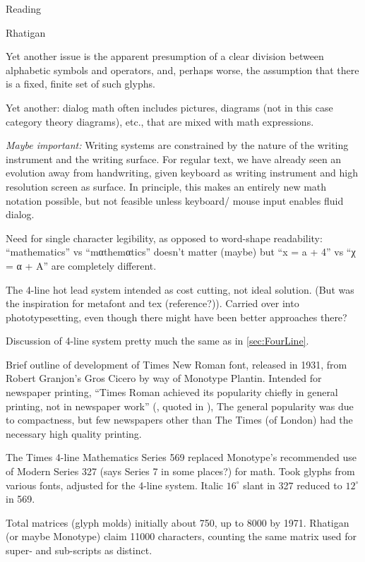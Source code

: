 \documentclass[11pt]{PalisadesLakesBook}
\begin{document}
\begin{plSection}{Reading}
\begin{plSection}{Rhatigan}
\begin{plSection}{}
Yet another issue is the apparent presumption of a clear division
between alphabetic symbols and operators, and, perhaps worse,
the assumption that there is a fixed, finite set of such glyphs.

Yet another: dialog math often includes pictures, diagrams 
(not in this case category theory diagrams), etc.,
that are mixed with math expressions.

\emph{Maybe important:} 
Writing systems are constrained by the nature of the writing
instrument and the writing surface.
For regular text, we have already seen an evolution away from
handwriting, given keyboard as writing instrument
and high resolution screen as surface.
In principle, this makes an entirely new math notation possible,
but not feasible unless keyboard/ mouse input enables
fluid dialog. 

Need for single character legibility, as opposed to word-shape
readability:
``mathematics'' vs ``mαthemαtics'' doesn't matter (maybe)
but ``x = a + 4'' vs ``χ = α + A'' are completely different.

\begin{plSection}{}

The 4-line hot lead system intended as cost cutting, 
not ideal solution.
(But was the inspiration for metafont and tex (reference?)).
Carried over into phototypesetting, 
even though there might have been better approaches there?

Discussion of 4-line system pretty much the same as in 
\cref{sec:FourLine}.

Brief outline of development of Times New Roman font,
released in 1931,
from Robert Granjon's Gros Cicero by way of Monotype Plantin.
Intended for newspaper printing,
``Times Roman achieved its popularity chiefly in general printing, 
not in newspaper work'' 
(,
quoted in \cite{wiki:TimesNewRoman}),
The general popularity was due to compactness,
but few newspapers other than The Times
(of London) had the necessary high quality printing.

The Times 4-line Mathematics Series 569 
replaced Monotype's recommended use of Modern Series 327 
(says Series 7 in some places?) for math.
Took glyphs from various fonts, adjusted for the 4-line system.
Italic $16^{\circ}$ slant in 327 reduced to $12^{\circ}$ in 569.

Total matrices (glyph molds) initially about 750, 
up to 8000 by 1971. 
Rhatigan (or maybe Monotype) claim 11000 characters,
counting the same matrix used for super- and sub-scripts
as distinct.


\end{plSection}
\end{plSection}
\end{plSection}
\end{plSection}
\end{document}
